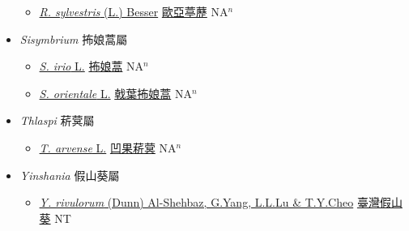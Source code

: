 \begin{itemize}
\begin{itemize}
        \item[] \href{http://www.theplantlist.org/tpl1.1/search?q=Rorippa+sylvestris}{\textit{R. sylvestris} (L.) Besser}   \href{\detokenize{http://taibnet.sinica.edu.tw/chi/taibnet_species_list.php?T2=歐亞葶藶&T2_new_value=true&fr=y}}{歐亞葶藶} NA$^n$
  \end{itemize}
 \item[] \textit{Sisymbrium} 抪娘蒿屬
                    
  \begin{itemize}
        \item[] \href{http://www.theplantlist.org/tpl1.1/search?q=Sisymbrium+irio}{\textit{S. irio} L.}   \href{\detokenize{http://taibnet.sinica.edu.tw/chi/taibnet_species_list.php?T2=抪娘蒿&T2_new_value=true&fr=y}}{抪娘蒿} NA$^n$
        \item[] \href{http://www.theplantlist.org/tpl1.1/search?q=Sisymbrium+orientale}{\textit{S. orientale} L.}   \href{\detokenize{http://taibnet.sinica.edu.tw/chi/taibnet_species_list.php?T2=戟葉抪娘蒿&T2_new_value=true&fr=y}}{戟葉抪娘蒿} NA$^n$
  \end{itemize}
 \item[] \textit{Thlaspi} 菥蓂屬
                    
  \begin{itemize}
        \item[] \href{http://www.theplantlist.org/tpl1.1/search?q=Thlaspi+arvense}{\textit{T. arvense} L.}   \href{\detokenize{http://taibnet.sinica.edu.tw/chi/taibnet_species_list.php?T2=凹果菥蓂&T2_new_value=true&fr=y}}{凹果菥蓂} NA$^n$
  \end{itemize}
 \item[] \textit{Yinshania} 假山葵屬
                    
  \begin{itemize}
        \item[] \href{http://www.theplantlist.org/tpl1.1/search?q=Yinshania+rivulorum}{\textit{Y. rivulorum} (Dunn) Al-Shehbaz, G.Yang, L.L.Lu \& T.Y.Cheo}     \href{\detokenize{http://taibnet.sinica.edu.tw/chi/taibnet_species_list.php?T2=臺灣假山葵&T2_new_value=true&fr=y}}{臺灣假山葵} NT
  \end{itemize}
  \end{itemize}
